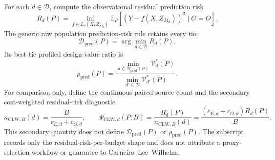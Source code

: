 For each \(d\in\mathcal D\), compute the observational residual prediction risk
\[
R_d(P)=\inf_{f\in L_2(X,Z_{M_d})}\mathbb E_P[(Y-f(X,Z_{M_d}))^2\mid G=O].
\]
The generic raw population prediction-risk rule retains every tie:
\[
\mathcal D_{\mathrm{pred}}(P)=\arg\min_{d\in\mathcal D}R_d(P).
\]
Its best-tie profiled design-value ratio is
\[
\rho_{\mathrm{pred}}(P)=
\frac{\min_{d\in\mathcal D_{\mathrm{pred}}(P)}\mathcal V_d^*(P)}
{\min_{d'\in\mathcal D}\mathcal V_{d'}^*(P)}.
\]
For comparison only, define the continuous paired-source count and the secondary cost-weighted residual-risk diagnostic
\[
n_{\mathrm{CLW},B}(d)=\frac{B}{c_{E,d}+c_{O,d}},
\qquad
\Psi_{\mathrm{CLW},d}(P;B)
=\frac{R_d(P)}{n_{\mathrm{CLW},B}(d)}
=\frac{(c_{E,d}+c_{O,d})R_d(P)}{B}.
\]
This secondary quantity does not define \(\mathcal D_{\mathrm{pred}}(P)\) or \(\rho_{\mathrm{pred}}(P)\). The subscript records only the residual-risk-per-budget shape and does not attribute a proxy-selection workflow or guarantee to Carneiro--Lee--Wilhelm.